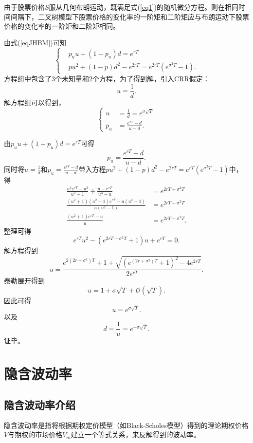 由于股票价格$S$服从几何布朗运动，既满足式(\ref{eq1})的随机微分方程。则在相同时间间隔下，二叉树模型下股票价格的变化率的一阶矩和二阶矩应与布朗运动下股票价格的变化率的一阶矩和二阶矩相同。

由式(\ref{eqJHBM})可知
\begin{equation*}
	\left\{
	\begin{aligned}
		& p_u u +(1-p_u)d = e^{rT} \nonumber\\
		& pu^2+(1-p)d^2 - e^{2rT}  = e^{2rT} \left(e^{\sigma^2 T}-1\right).
	\end{aligned}
	\right.
\end{equation*}
方程组中包含了3个未知量和2个方程，为了得到解，引入CRR假定：
$$u = \frac{1}{d}.$$
解方程组可以得到，
\begin{equation*}
	\left\{
	\begin{aligned}
		u &= \frac{1}{d} = e^{\sigma\sqrt{T}} \nonumber\\
		p_u & = \frac{e^{rT}-d}{u-d} .\nonumber
	\end{aligned}
	\right.
\end{equation*}
\begin{Proof}
由$p_u u +(1-p_u)d = e^{rT}$可得
$$p_u= \frac{e^{rT}-d}{u-d} .$$
同时将$u=\frac{1}{d}$和$p_u= \frac{e^{rT}-d}{u-d} $带入方程$ pu^2+(1-p)d^2 - e^{2rT}  = e^{rT} \left(e^{\sigma^2 T}-1\right)$中，得
\begin{align}
	\frac{u^3e^{rT}-u^2}{u^2-1}+\frac{u-e^{rT}}{u^3-u} &= e^{2rT+\sigma^2 T} \nonumber\\
	\frac{\left(u^2+1\right)\left(u^2-1\right)e^{rT}-u\left(u^2-1\right)}{u(u^2-1)}&= e^{2rT+\sigma^2 T} \nonumber\\
	\frac{(u^2+1)e^{rT}-u}{u}&= e^{2rT+\sigma^2 T}. \nonumber
\end{align}
整理可得
$$e^{rT}u^2-\left(e^{2rT+\sigma^2T}+1\right)u+e^{rT} = 0 .$$
解方程得到
$$u = \frac{e^{2\left(2r+\sigma^2\right)T}+1+\sqrt{\left(e^{\left(2r+\sigma^2\right)T}+1\right)^2-4e^{2rT}}}{2e^{rT}}.$$
泰勒展开得到
$$u = 1+\sigma\sqrt{T}+\mathcal{O}\left(\sqrt{T}\right).$$
因此可得
$$u = e^{\sigma\sqrt{T}}.$$
以及
$$d = \frac{1}{u} = e^{-\sigma\sqrt{T}}.$$
证毕。
\end{Proof}

\section{隐含波动率}

\subsection{隐含波动率介绍}
隐含波动率是指将根据期权定价模型（如Black-Scholes模型）得到的理论期权价格$V$与期权的市场价格$V_m$建立一个等式关系，来反解得到的波动率。

